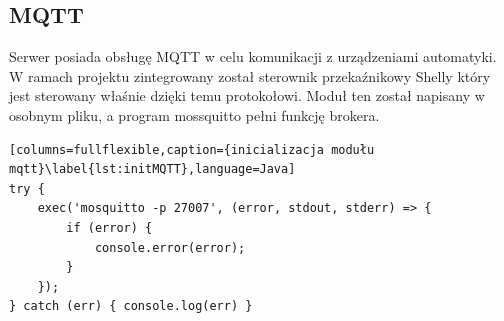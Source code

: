 \subsection{MQTT}
Serwer posiada obsługę MQTT w celu komunikacji z urządzeniami automatyki. W ramach projektu zintegrowany został sterownik przekaźnikowy Shelly który jest sterowany właśnie dzięki temu protokołowi. Moduł ten został napisany w osobnym pliku, a program mossquitto pełni funkcję brokera. 

\begin{lstlisting}[columns=fullflexible,caption={inicializacja modułu mqtt}\label{lst:initMQTT},language=Java]
try {
	exec('mosquitto -p 27007', (error, stdout, stderr) => {
		if (error) {
			console.error(error);
		}
	});
} catch (err) { console.log(err) }
\end{lstlisting}
